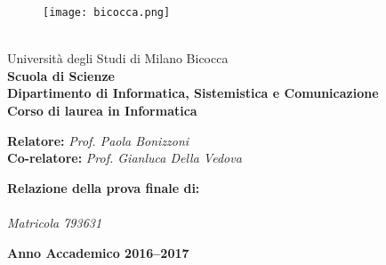 
\makeatletter

\begin{titlepage}

  \begin{spacing}{1.48}
    \begin{wrapfigure}[5]{l}[20mm]{0.2\linewidth}
      \texttt{[image: bicocca.png]}
    \end{wrapfigure}
    \text{} \\[-0.027\textheight]
    Università degli Studi di Milano Bicocca \\
    \textbf{Scuola di Scienze} \\
    \textbf{Dipartimento di Informatica, Sistemistica e Comunicazione} \\
    \textbf{Corso di laurea in Informatica}
  \end{spacing}

  \vfill

  \begin{spacing}{2}
    \begin{center}
      {\huge \textbf{\@title}}
    \end{center}
  \end{spacing}

  \vfill

  \begin{onehalfspace}
    \begin{flushleft}
      {\large \textbf{Relatore:}    \textit{Prof. Paola Bonizzoni} \\
              \textbf{Co-relatore:} \textit{Prof. Gianluca Della Vedova}}
    \end{flushleft}
  \end{onehalfspace}

  \vfill

  \begin{onehalfspace}
    \begin{flushright}
      {\large \textbf{Relazione della prova finale di:} \\
              \textit{\@author} \\
              \textit{Matricola 793631}}
    \end{flushright}
  \end{onehalfspace}

  \vfill

  \begin{center}
    {\large \textbf{Anno Accademico 2016--2017}}
  \end{center}

\end{titlepage}

\makeatother
